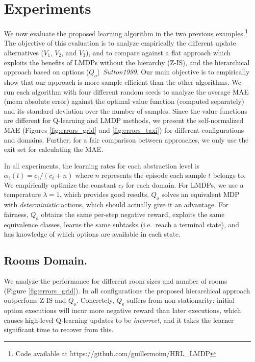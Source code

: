 \section{Experiments}
We now evaluate the proposed learning algorithm in the two previous examples.\footnote{Code available at https://github.com/guillermoim/HRL\_LMDP}
The objective of this evaluation is to analyze empirically the different update alternatives ($V_1$, $V_2$, and $V_3$), and
to compare against a flat approach which exploits the benefits of LMDPs without the hierarchy (Z-IS), and the hierarchical approach based on options ($Q_o$)~\textit{Sutton1999}. Our main objective is to empirically show that our approach is more sample efficient than the other algorithms. We run each algorithm with four different random seeds to analyze the average MAE (mean absolute error) against the optimal value function (computed separately) and its standard deviation over the number of samples. Since the value functions are different for Q-learning and LMDP methods, we present the self-normalized MAE (Figures \ref{fig:errors_grid} and \ref{fig:errors_taxi}) for different configurations and domains. Further, for a fair comparison between approaches, we only use the exit set for calculating the MAE.


In all experiments, the learning rates for each abstraction level is $\alpha_\ell(t) = c_\ell / (c_\ell + n)$ where $n$ represents the episode each sample $t$ belongs to. We empirically optimize the constant $c_\ell$ for each domain. For LMDPs, we use a temperature $\lambda=1$, which provides good results. $Q_o$ solves an equivalent MDP with {\em deterministic} actions, which should actually give it an advantage. For fairness, $Q_o$ obtains the same per-step negative reward, exploits the same equivalence classes, learns the same subtasks (i.e.~reach a terminal state), and has knowledge of which options are available in each state.

\subsection{Rooms Domain.}
We analyze the performance for different room sizes and number of rooms (Figure \ref{fig:errors_grid}). In all configurations the proposed hierarchical approach outperfoms Z-IS and $Q_o$. Concretely, $Q_o$ suffers from non-stationarity: initial option executions will incur more negative reward than later executions, which causes high-level Q-learning updates to be {\em incorrect}, and it takes the learner significant time to recover from this.

